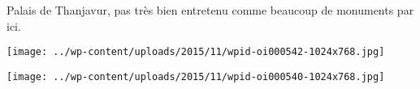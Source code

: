  Palais de Thanjavur, pas très bien entretenu comme beaucoup de monuments par ici. 
\begin{center} \texttt{[image: ../wp-content/uploads/2015/11/wpid-oi000542-1024x768.jpg]} \end{center}
\begin{center} \texttt{[image: ../wp-content/uploads/2015/11/wpid-oi000540-1024x768.jpg]} \end{center}
